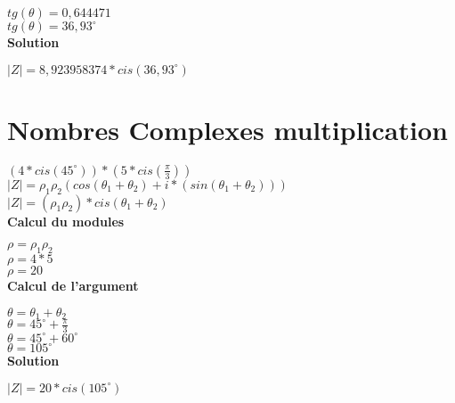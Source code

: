 $tg(\theta) = 0,644471$ \\

$tg(\theta) = 36,93^{\circ}$ \\


\vspace{6mm}
\textbf{Solution}
\vspace{5mm}

$|Z| = 8,923958374*cis(36,93^{\circ})$ \\

\newpage
\section{Nombres Complexes multiplication}
\vspace{3mm} %

$(4 * cis(45^{\circ} )) * (5 * cis(\frac{\pi}{3}))$ \\

$|Z| = \rho_{1}\rho_{2}( cos(\theta_{1} + \theta_{2}) + i*(sin(\theta_{1} + \theta_{2})) )$ \\

$|Z| = (\rho_{1}\rho_{2})*cis(\theta_{1} + \theta_{2})$ \\


\vspace{6mm}
\textbf{Calcul du modules}
\vspace{5mm}

$\rho = \rho_{1}\rho_{2}$ \\

$\rho = 4*5 $ \\

$\rho = 20 $ \\

\vspace{6mm}
\textbf{Calcul de l'argument}
\vspace{5mm}

$\theta = \theta_{1}+\theta_{2}$ \\

$\theta = 45^{\circ} + \frac{\pi}{3}$ \\

$\theta = 45^{\circ} + 60^{\circ}$ \\

$\theta = 105^{\circ}$ \\

\vspace{6mm}
\textbf{Solution}
\vspace{5mm}

$|Z| = 20 * cis(105^{\circ})$

